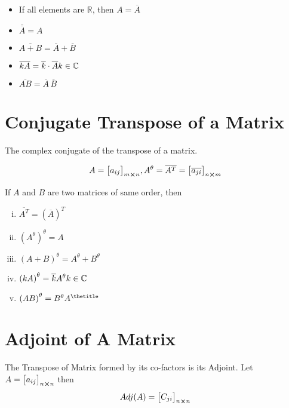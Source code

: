 \documentclass{article}
\begin{document}
\begin{itemize}
    \item If all elements are $\mathbb{R} $, then $A=\overline{A}$
    \item $\overline{\overline{A}}=A$
    \item $\overline{A+B}=\overline{A}+\overline{B}$
    \item $\overline{kA}=\overline{k} \cdot \overline{A} \hfill k \in \mathbb{C} $
    \item $\overline{AB}=\overline{A} \, \overline{B} $
\end{itemize}

\section{Conjugate Transpose of a Matrix}
The complex conjugate of the transpose of a matrix.

$$A={\begin{bmatrix}
        a_{ij}
    \end{bmatrix}}_{m \cross n}, A^{\theta} =\overline{A^T}={\begin{bmatrix}
        \overline{a_{ji}}
    \end{bmatrix}}_{n \cross m} $$

If $A$ and $B$ are two matrices of same order, then
\begin{enumerate}[i.]
    \item $\overline{A^T}=\left(\overline{A}\right)^T$
    \item $\left(A^\theta\right)^\theta=A$
    \item $\left(A+B\right)^\theta=A^\theta+B^\theta $
    \item $\left(kA\right)^\theta=\overline{k} A^\theta \hfill k \in \mathbb{C} $
    \item $\left(AB\right)^\theta=B^\theta A^\thetitle $
\end{enumerate}

\section{Adjoint of A Matrix}
The Transpose of Matrix formed by its co-factors is its Adjoint.
\newline \newline
Let $A={\begin{bmatrix}
        a_{ij}
    \end{bmatrix}}_{n \cross n} $
\newline \newline
then $$Adj(A)={\begin{bmatrix}
        C_{ji}
    \end{bmatrix}}_{n \cross n} $$
\end{document}
